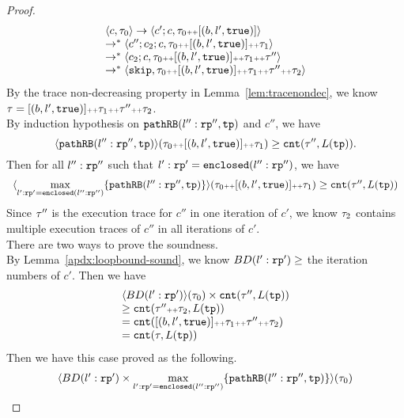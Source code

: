 \begin{proof}
\[
  \begin{array}{l}
  \langle c, \mathtt{\tau}_0 \rangle \to \langle c';c, \mathtt{\tau}_0 {\scriptscriptstyle ++} [(b, l', \mathtt{true})] \rangle \\
  \to^* \langle c'';c_2;c, \mathtt{\tau}_0 {\scriptscriptstyle ++} [(b, l', \mathtt{true})] {\scriptscriptstyle ++} \mathtt{\tau}_1 \rangle \\
  \to^* \langle c_2;c, \mathtt{\tau}_0 {\scriptscriptstyle ++} [(b, l', \mathtt{true})] {\scriptscriptstyle ++} \mathtt{\tau}_1 {\scriptscriptstyle ++} \mathtt{\tau}'' \rangle \\
  \to^* \langle \mathtt{skip}, \mathtt{\tau}_0 {\scriptscriptstyle ++} [(b, l', \mathtt{true})] {\scriptscriptstyle ++} \mathtt{\tau}_1 {\scriptscriptstyle ++} \mathtt{\tau}'' {\scriptscriptstyle ++} \mathtt{\tau}_2 \rangle
  \end{array}
\]
By the trace non-decreasing property in Lemma~\ref{lem:tracenondec},
we know $\mathtt{\tau} = [(b, l', \mathtt{true})] {\scriptscriptstyle ++} \mathtt{\tau}_1 {\scriptscriptstyle ++} \mathtt{\tau}'' {\scriptscriptstyle ++} \mathtt{\tau}_2$.
\\
By induction hypothesis on $\mathtt{pathRB}(l'':\mathtt{rp}'', \mathtt{tp})$ and $c''$, we have
\[
  \langle \mathtt{pathRB}(l'':\mathtt{rp}'', \mathtt{tp}) \rangle(\mathtt{\tau}_0 {\scriptscriptstyle ++} [(b, l', \mathtt{true})] {\scriptscriptstyle ++} \mathtt{\tau}_1) 
  \geq \mathtt{cnt}(\mathtt{\tau}'', L(\mathtt{tp})).
\]
Then for all $l'':\mathtt{rp}''$ such that $l': \mathtt{rp}' = \mathtt{enclosed}(l'':\mathtt{rp}'')$, we have 
\[
  \begin{array}{l}
  \langle \max\limits_{l': \mathtt{rp}' = \mathtt{enclosed}(l'':\mathtt{rp}'')} \{\mathtt{pathRB}(l'':\mathtt{rp}'', \mathtt{tp})\} \rangle
  (\mathtt{\tau}_0 {\scriptscriptstyle ++} [(b, l', \mathtt{true})] {\scriptscriptstyle ++} \mathtt{\tau}_1)
  \geq \mathtt{cnt}(\mathtt{\tau}'', L(\mathtt{tp}))
  \end{array}
\]
Since $\mathtt{\tau}''$ is the execution trace for $c''$ in one iteration of $c'$,
we know $\mathtt{\tau}_2$ contains multiple execution traces of  $c''$ in all iterations of $c'$.
\\
There are two ways to prove the soundness.
\\
By Lemma~\ref{apdx:loopbound-sound}, we know $BD(l':\mathtt{rp}') \geq$ the iteration numbers of $c'$. Then we have
\[
  \begin{array}{l}
  \langle  BD(l':\mathtt{rp}') \rangle(\mathtt{\tau}_0) \times \mathtt{cnt}(\mathtt{\tau}'', L(\mathtt{tp})) \\
  \geq \mathtt{cnt}(\mathtt{\tau}'' {\scriptscriptstyle ++} \mathtt{\tau}_2, L(\mathtt{tp})) \\
  = \mathtt{cnt}([(b, l', \mathtt{true})] {\scriptscriptstyle ++} \mathtt{\tau}_1 {\scriptscriptstyle ++} \mathtt{\tau}'' {\scriptscriptstyle ++} \mathtt{\tau}_2)\\
  = \mathtt{cnt}(\mathtt{\tau}, L(\mathtt{tp}))
  \end{array}
\]
Then we have this case proved as the following.
\[
  \begin{array}{l}
  \langle  BD(l':\mathtt{rp}') \times \max\limits_{l': \mathtt{rp}' = \mathtt{enclosed}(l'':\mathtt{rp}'')} \{\mathtt{pathRB}(l'':\mathtt{rp}'', \mathtt{tp})\} \rangle(\mathtt{\tau}_0)\\

\end{array}\]
\end{proof}
